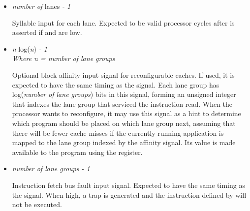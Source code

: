 \begin{itemize}
\vspace{1em}
\item {}\textit{number of} lanes \textit{- 1}

Syllable input for each lane. Expected to be valid  processor cycles 
after  is asserted if  and 
 are low.

\vspace{1em}
\item {}\textit{n} log(\textit{n}) \textit{- 1}\\
\textit{Where n = number of lane groups}

Optional block affinity input signal for reconfigurable caches. If used, it is 
expected to have the same timing as the  signal. Each lane 
group has log(\textit{number of lane groups}) bits in this signal, forming an 
unsigned integer that indexes the lane group that serviced the instruction 
read. When the processor wants to reconfigure, it may use this signal as a hint 
to determine which program should be placed on which lane group next, assuming 
that there will be fewer cache misses if the currently running application is 
mapped to the lane group indexed by the affinity signal. Its value is made
available to the program using the  register.

\vspace{1em}
\item {}\textit{number of lane groups - 1}

Instruction fetch bus fault input signal. Expected to have the same timing as the 
 signal. When high, a  trap is generated 
and the instruction defined by  will not be executed.

\end{itemize}

